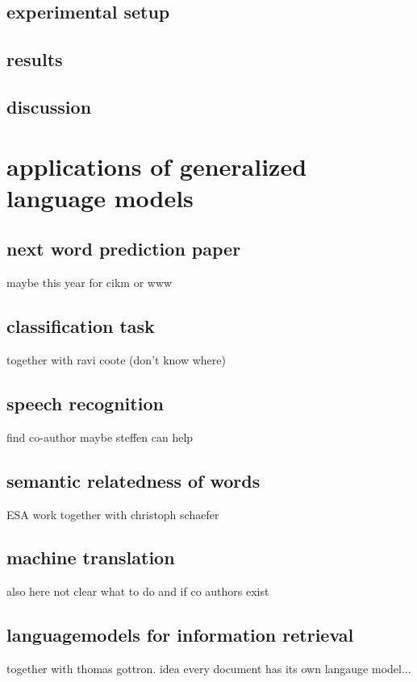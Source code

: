 \documentclass[•]{book}
\begin{document}
\section{experimental setup}
\section{results}
\section{discussion}

\chapter{applications of generalized language models}
\section{next word prediction paper}
maybe this year for cikm or www

\section{classification task}
together with ravi coote (don't know where)

\section{speech recognition}
find co-author maybe steffen can help

\section{semantic relatedness of words}
ESA work together with christoph schaefer

\section{machine translation}
also here not clear what to do and if co authors exist

\section{languagemodels for information retrieval}
together with thomas gottron. idea every document has its own langauge model...
\end{document}
